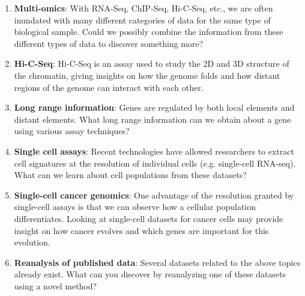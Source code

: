 \documentclass[11pt,onecolumn]{article}
\begin{document}
\begin{enumerate}
	\item \textbf{Multi-omics}: With RNA-Seq, ChIP-Seq, Hi-C-Seq, etc., we are often inundated with many different categories of data for the same type of biological sample. Could we possibly combine the information from these different types of data to discover something more? 
	\item \textbf{Hi-C-Seq}: Hi-C-Seq is an assay used to study the 2D and 3D structure of the chromatin, giving insights on how the genome folds and how distant regions of the genome can interact with each other.
	\item \textbf{Long range information}: Genes are regulated by both local elements and distant elements. What long range information can we obtain about a gene using various assay techniques?
	\item \textbf{Single cell assays}: Recent technologies have allowed researchers to extract cell signatures at the resolution of individual cells (e.g. single-cell RNA-seq). What can we learn about cell populations from these datasets?
	\item \textbf{Single-cell cancer genomics}: One advantage of the resolution granted by single-cell assays is that we can observe how a cellular population differentiates. Looking at single-cell datasets for cancer cells may provide insight on how cancer evolves and which genes are important for this evolution.
	\item \textbf{Reanalysis of published data}: Several datasets related to the above topics already exist. What can you discover by reanalyzing one of these datasets using a novel method? 
\end{enumerate}
\end{document}
